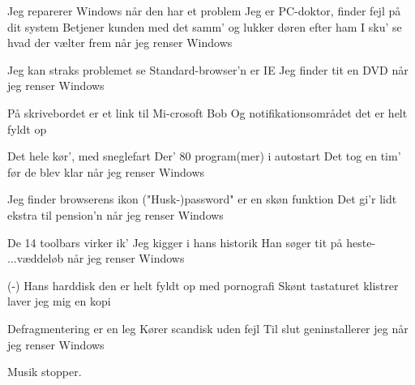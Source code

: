 \documentclass[a4paper,11pt]{article}
\begin{document}
\begin{song}

%
  Jeg reparerer Windows når den har et problem
  Jeg er PC-doktor, finder fejl på dit system
 Betjener kunden med det samm'
 og lukker døren efter ham
 I sku' se hvad der vælter frem
 når jeg renser Windows

 Jeg kan straks problemet se
 Standard-browser'n er IE
 Jeg finder tit en DVD
 når jeg renser Windows

% 
  På skrivebordet er et link
  til Mi-crosoft Bob
 Og notifikationsområdet 
 det er helt fyldt op

%
  Det hele kør', med sneglefart
  Der' 80 program(mer) i autostart
  Det tog en tim' før de blev klar
 når jeg renser Windows

%
  Jeg finder browserens ikon
  ("Husk-)password" er en skøn funktion
  Det gi'r lidt ekstra til pension'n
 når jeg renser Windows

 De 14 toolbars virker ik'
 Jeg kigger i hans historik
 Han søger tit på heste-  ...væddeløb 
 når jeg renser Windows


%
  (-) Hans harddisk den er helt fyldt op
  med pornografi
%
  Skønt tastaturet klistrer
  laver jeg mig en kopi

%
  Defragmentering er en leg
  Kører scandisk uden fejl
  Til slut geninstallerer jeg
  når jeg renser Windows

{\scene Musik stopper.}
\end{song}
\end{document}
